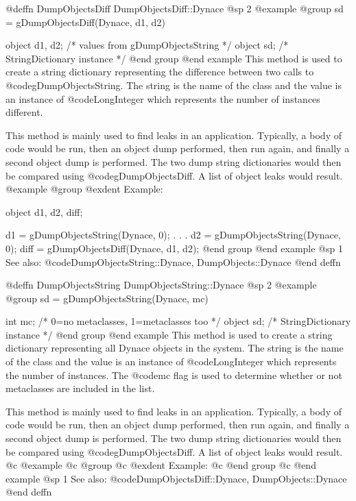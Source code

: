 @deffn {DumpObjectsDiff} DumpObjectsDiff::Dynace
@sp 2
@example
@group
sd = gDumpObjectsDiff(Dynace, d1, d2)

object  d1, d2; /*  values from gDumpObjectsString  */
object  sd;     /*  StringDictionary instance  */
@end group
@end example
This method is used to create a string dictionary representing
the difference between two calls to @code{gDumpObjectsString}.
The string is the name of the class and
the value is an instance of @code{LongInteger} which represents the
number of instances different.

This method is mainly used to find leaks in an application.  Typically,
a body of code would be run, then an object dump performed, then run
again, and finally a second object dump is performed.  The two dump
string dictionaries would then be compared using
@code{gDumpObjectsDiff}.  A list of object leaks would result.
@example
@group
@exdent Example:

object   d1, d2, diff;

d1 = gDumpObjectsString(Dynace, 0);
       .
       .
       .
d2 = gDumpObjectsString(Dynace, 0);
diff = gDumpObjectsDiff(Dynace, d1, d2);
@end group
@end example
@sp 1
See also:  @code{DumpObjectsString::Dynace, DumpObjects::Dynace}
@end deffn




























@deffn {DumpObjectsString} DumpObjectsString::Dynace
@sp 2
@example
@group
sd = gDumpObjectsString(Dynace, mc)

int     mc;     /*  0=no metaclasses, 1=metaclasses too  */
object  sd;     /*  StringDictionary instance  */
@end group
@end example
This method is used to create a string dictionary representing all
Dynace objects in the system.  The string is the name of the class and
the value is an instance of @code{LongInteger} which represents the
number of instances.  The @code{mc} flag is used to determine whether or
not metaclasses are included in the list.

This method is mainly used to find leaks in an application.  Typically,
a body of code would be run, then an object dump performed, then run
again, and finally a second object dump is performed.  The two dump
string dictionaries would then be compared using
@code{gDumpObjectsDiff}.  A list of object leaks would result.
@c @example
@c @group
@c @exdent Example:
@c @end group
@c @end example
@sp 1
See also:  @code{DumpObjectsDiff::Dynace, DumpObjects::Dynace}
@end deffn














